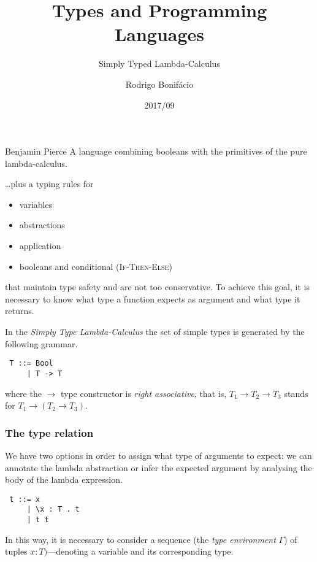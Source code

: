 \documentclass{beamer}
\title{Types and Programming Languages}
\subtitle{Simply Typed Lambda-Calculus}
\author{Rodrigo Bonif\'{a}cio}
\date{2017/09}
\begin{document}
\begin{frame}
\titlepage
\end{frame}

\begin{frame}

\begin{shadequote}[l]{Benjamin Pierce}
A language combining booleans with the 
primitives of the pure lambda-calculus. 
\end{shadequote} \pause

\begin{block}{\ldots plus a typing rules for}

\begin{itemize}
\item variables
\item abstractions
\item application
\item booleans and conditional (\textsc{If-Then-Else}) 
\end{itemize} \pause 

that maintain type safety and are not too 
conservative. \pause To achieve this goal, it is 
necessary to know what type a function expects as 
argument and what type it returns. 

\end{block}

\end{frame}

\begin{frame}[fragile] 
In the \emph{Simply Type Lambda-Calculus} the set of 
simple types is generated by the following grammar. 

\begin{verbatim}
 T ::= Bool 
     | T -> T
\end{verbatim} 

where the \texttt{$\rightarrow$} type constructor is 
\emph{right associative}, that is, 
$T_1 \rightarrow T_2 \rightarrow T_3$ stands for 
$T_1 \rightarrow (T_2 \rightarrow T_3)$. 

\end{frame}

\begin{frame}[fragile]
\frametitle{The type relation} 

We have two options in order to assign 
what type of arguments to expect\pause: 
we can annotate the lambda abstraction or 
infer the expected argument by analysing the 
body of the lambda expression. \pause

\begin{verbatim}
 t ::= x 
     | \x : T . t
     | t t
\end{verbatim}

In this way, it is necessary to consider a
sequence (the \emph{type environment} $\Gamma$) 
of tuples $x : T)$---denoting a variable  
and its corresponding type. 

\end{frame}
\end{document}

